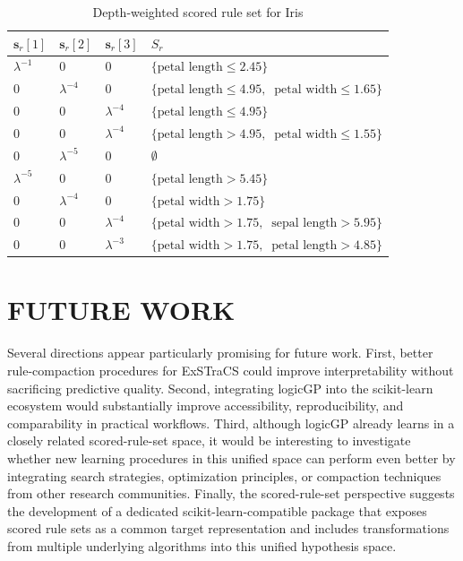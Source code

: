 \documentclass[a4paper,twoside]{article}
\begin{document}
\begin{table}
  \centering
  \caption{Depth-weighted scored rule set for Iris}
  \label{tab:cart_iris_example_depth_weighted_pruned}
  \begin{tabular}{p{0.6cm} p{0.6cm} p{0.6cm} p{3.2cm}}
    \toprule
    $\mathbf{s}_r[1]$ & $\mathbf{s}_r[2]$ & $\mathbf{s}_r[3]$ & $S_r$ \\
    \midrule
    $\lambda^{-1}$ & $0$ & $0$ & $\{\text{petal length} \leq 2.45\}$ \\
    $0$ & $\lambda^{-4}$ & $0$ & $\{\text{petal length} \leq 4.95,\ $ $\text{petal width} \leq 1.65\}$ \\
    $0$ & $0$ & $\lambda^{-4}$ & $\{\text{petal length} \leq 4.95\}$ \\
    $0$ & $0$ & $\lambda^{-4}$ & $\{\text{petal length} > 4.95,\ $ $\text{petal width} \leq 1.55\}$ \\
    $0$ & $\lambda^{-5}$ & $0$ & $\emptyset$ \\
    $\lambda^{-5}$ & $0$ & $0$ & $\{\text{petal length} > 5.45\}$ \\
    $0$ & $\lambda^{-4}$ & $0$ & $\{\text{petal width} > 1.75\}$ \\
    $0$ & $0$ & $\lambda^{-4}$ & $\{\text{petal width} > 1.75,\ $ $\text{sepal length} > 5.95\}$ \\
    $0$ & $0$ & $\lambda^{-3}$ & $\{\text{petal width} > 1.75,\ $ $\text{petal length} > 4.85\}$ \\
    \bottomrule
  \end{tabular}
\end{table}


\section{\uppercase{Future Work}}

Several directions appear particularly promising for future work. First, better rule-compaction procedures for ExSTraCS could improve interpretability without sacrificing predictive quality. Second, integrating logicGP into the scikit-learn ecosystem would substantially improve accessibility, reproducibility, and comparability in practical workflows. Third, although logicGP already learns in a closely related scored-rule-set space, it would be interesting to investigate whether new learning procedures in this unified space can perform even better by integrating search strategies, optimization principles, or compaction techniques from other research communities. Finally, the scored-rule-set perspective suggests the development of a dedicated scikit-learn-compatible package that exposes scored rule sets as a common target representation and includes transformations from multiple underlying algorithms into this unified hypothesis space.
\end{document}
